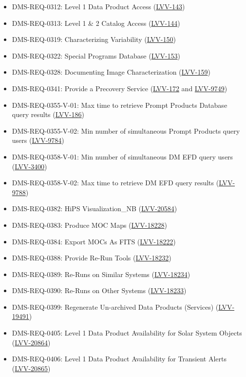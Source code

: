 \begin{itemize}
\item DMS-REQ-0312: Level 1 Data Product Access (\href{https://rubinobs.atlassian.net/browse/LVV-143}{LVV-143})
\item DMS-REQ-0313: Level 1 & 2 Catalog Access (\href{https://rubinobs.atlassian.net/browse/LVV-144}{LVV-144})
\item DMS-REQ-0319: Characterizing Variability (\href{https://rubinobs.atlassian.net/browse/LVV-150}{LVV-150})
\item DMS-REQ-0322: Special Programs Database (\href{https://rubinobs.atlassian.net/browse/LVV-153}{LVV-153})
\item DMS-REQ-0328: Documenting Image Characterization (\href{https://rubinobs.atlassian.net/browse/LVV-159}{LVV-159})
\item DMS-REQ-0341: Provide a Precovery Service (\href{https://rubinobs.atlassian.net/browse/LVV-172}{LVV-172} and \href{https://rubinobs.atlassian.net/browse/LVV-9749}{LVV-9749})
\item DMS-REQ-0355-V-01: Max time to retrieve Prompt Products Database query results (\href{https://rubinobs.atlassian.net/browse/LVV-186}{LVV-186})
\item DMS-REQ-0355-V-02: Min number of simultaneous Prompt Products query users (\href{https://rubinobs.atlassian.net/browse/LVV-9784}{LVV-9784})
\item DMS-REQ-0358-V-01: Min number of simultaneous DM EFD query users (\href{https://rubinobs.atlassian.net/browse/LVV-3400}{LVV-3400})
\item DMS-REQ-0358-V-02: Max time to retrieve DM EFD query results (\href{https://rubinobs.atlassian.net/browse/LVV-9788}{LVV-9788})
\item DMS-REQ-0382: HiPS Visualization_NB (\href{https://rubinobs.atlassian.net/browse/LVV-20584}{LVV-20584})
\item DMS-REQ-0383: Produce MOC Maps (\href{https://rubinobs.atlassian.net/browse/LVV-18228}{LVV-18228})
\item DMS-REQ-0384: Export MOCs As FITS (\href{https://rubinobs.atlassian.net/browse/LVV-18222}{LVV-18222})
\item DMS-REQ-0388: Provide Re-Run Tools (\href{https://rubinobs.atlassian.net/browse/LVV-18232}{LVV-18232})
\item DMS-REQ-0389: Re-Runs on Similar Systems (\href{https://rubinobs.atlassian.net/browse/LVV-18234}{LVV-18234})
\item DMS-REQ-0390: Re-Runs on Other Systems (\href{https://rubinobs.atlassian.net/browse/LVV-18233}{LVV-18233})
\item DMS-REQ-0399: Regenerate Un-archived Data Products (Services) (\href{https://rubinobs.atlassian.net/browse/LVV-19491}{LVV-19491})
\item DMS-REQ-0405: Level 1 Data Product Availability for Solar System Objects (\href{https://rubinobs.atlassian.net/browse/LVV-20864}{LVV-20864})
\item DMS-REQ-0406: Level 1 Data Product Availability for Transient Alerts (\href{https://rubinobs.atlassian.net/browse/LVV-20865}{LVV-20865})
\end{itemize}